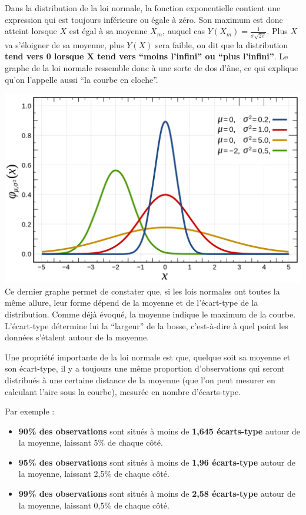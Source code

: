 \documentclass[
]{book}
\providecommand{\tightlist}{%
  \setlength{\itemsep}{0pt}\setlength{\parskip}{0pt}}
\begin{document}
Dans la distribution de la loi normale, la fonction exponentielle contient une expression qui est toujours inférieure ou égale à zéro. Son maximum est donc atteint lorsque \(X\) est égal à sa moyenne \(X_m\), auquel cas \(Y(X_m) = \frac{1}{ \sigma \sqrt{2\pi}}\). Plus \(X\) va s'éloigner de sa moyenne, plus \(Y(X)\) sera faible, on dit que la distribution \textbf{tend vers 0 lorsque X tend vers ``moins l'infini'' ou ``plus l'infini''}. Le graphe de la loi normale ressemble donc à une sorte de dos d'âne, ce qui explique qu'on l'appelle aussi ``la courbe en cloche''.

\includegraphics{images/loisnormales.png} Ce dernier graphe permet de constater que, si les lois normales ont toutes la même allure, leur forme dépend de la moyenne et de l'écart-type de la distribution. Comme déjà évoqué, la moyenne indique le maximum de la courbe. L'écart-type détermine lui la ``largeur'' de la bosse, c'est-à-dire à quel point les données s'étalent autour de la moyenne.

Une propriété importante de la loi normale est que, quelque soit sa moyenne et son écart-type, il y a toujours une même proportion d'observations qui seront distribués à une certaine distance de la moyenne (que l'on peut mesurer en calculant l'aire sous la courbe), mesurée en nombre d'écarts-type.

Par exemple :

\begin{itemize}
\tightlist
\item
  \textbf{90\% des observations} sont situés à moins de \textbf{1,645 écarts-type} autour de la moyenne, laissant 5\% de chaque côté.
\item
  \textbf{95\% des observations} sont situés à moins de \textbf{1,96 écarts-type} autour de la moyenne, laissant 2,5\% de chaque côté.
\item
  \textbf{99\% des observations} sont situés à moins de \textbf{2,58 écarts-type} autour de la moyenne, laissant 0,5\% de chaque côté.
\end{itemize}
\end{document}
